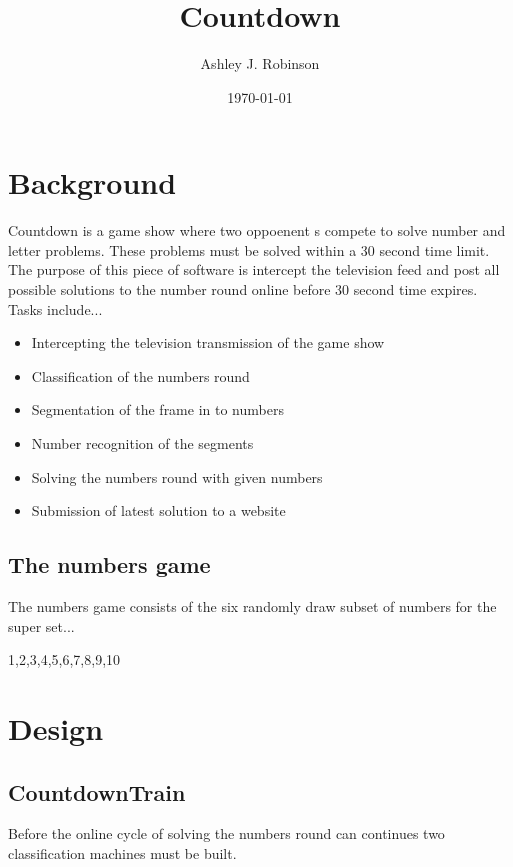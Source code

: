 \documentclass[paper=a4, fontsize=11pt]{scrartcl} %
\title{  
\normalfont \normalsize 
\huge Countdown \\ %
}
\author{Ashley J. Robinson} %
\date{\normalsize\today} %
\begin{document}
\maketitle %


\section{Background}

Countdown is a game show where two oppoenent s compete to solve number and letter problems.
These problems must be solved within a 30 second time limit.
The purpose of this piece of software is intercept the television feed and 
post all possible solutions to the number round online before 30 second time expires.
Tasks include...

\begin{itemize}
   \item Intercepting the television transmission of the game show 
   \item Classification of the numbers round
   \item Segmentation of the frame in to numbers 
   \item Number recognition of the segments
   \item Solving the numbers round with given numbers
   \item Submission of latest solution to a website
\end{itemize}

\subsection{The numbers game}
The numbers game consists of the six randomly draw subset of numbers for the super set...

1,2,3,4,5,6,7,8,9,10

\section{Design}

\subsection{CountdownTrain}

Before the online cycle of solving the numbers round can continues two classification
machines must be built.
\end{document}
